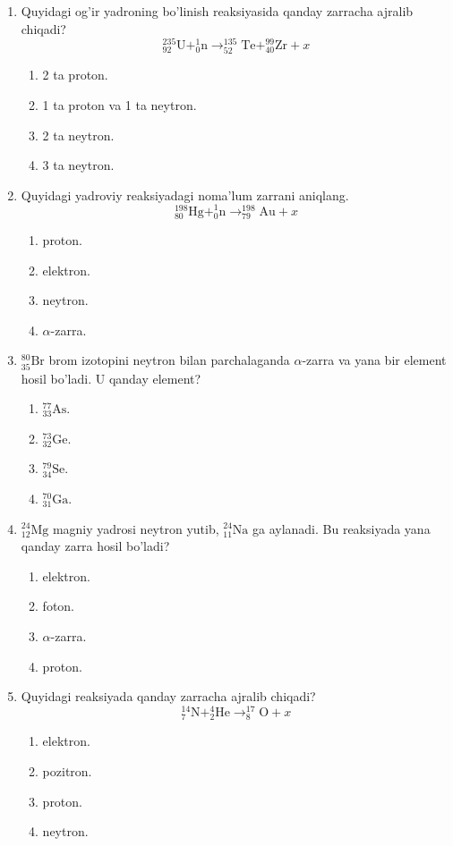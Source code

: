 \begin{enumerate}
\item Quyidagi og'ir yadroning bo'linish reaksiyasida qanday zarracha ajralib chiqadi?
$$^{235}_{92}\text{U} + ^1_0\text{n} \rightarrow ^{135}_{52}\text{Te} + ^{99}_{40}\text{Zr} + x$$
\begin{enumerate}[label=\Alph*)]
\item 2 ta proton.
\item 1 ta proton va 1 ta neytron.
\item 2 ta neytron.
\item 3 ta neytron.
\end{enumerate}

\item Quyidagi yadroviy reaksiyadagi noma'lum zarrani aniqlang.
$$^{198}_{80}\text{Hg} + ^1_0\text{n} \rightarrow ^{198}_{79}\text{Au} + x$$
\begin{enumerate}[label=\Alph*)]
\item proton.
\item elektron.
\item neytron.
\item $\alpha$-zarra.
\end{enumerate}

\item $^{80}_{35}\text{Br}$ brom izotopini neytron bilan parchalaganda $\alpha$-zarra va yana bir element hosil bo'ladi. U qanday element?
\begin{enumerate}[label=\Alph*)]
\item $^{77}_{33}\text{As}$.
\item $^{73}_{32}\text{Ge}$.
\item $^{79}_{34}\text{Se}$.
\item $^{70}_{31}\text{Ga}$.
\end{enumerate}

\item $^{24}_{12}\text{Mg}$ magniy yadrosi neytron yutib, $^{24}_{11}\text{Na}$ ga aylanadi. Bu reaksiyada yana qanday zarra hosil bo'ladi?
\begin{enumerate}[label=\Alph*)]
\item elektron.
\item foton.
\item $\alpha$-zarra.
\item proton.
\end{enumerate}

\setcounter{enumi}{13}
\item Quyidagi reaksiyada qanday zarracha ajralib chiqadi?
$$^{14}_7\text{N} + ^4_2\text{He} \rightarrow ^{17}_8\text{O} + x$$
\begin{enumerate}[label=\Alph*)]
\item elektron.
\item pozitron.
\item proton.
\item neytron.
\end{enumerate}


\end{enumerate}
